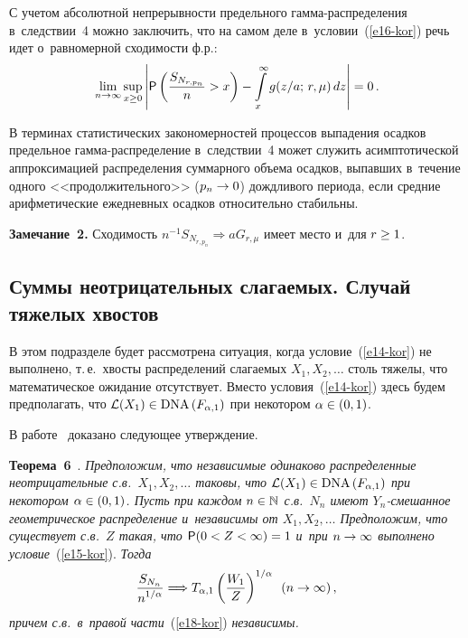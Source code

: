 \begin{multicols}{2}
С учетом абсолютной непрерывности предельного гам\-ма-рас\-пре\-де\-ле\-ния 
в~следствии~4 можно заключить, что на самом деле в~условии~(\ref{e16-kor}) речь
идет о~равномерной сходимости ф.р.:
$$
\lim\limits_{n\to\infty}\sup\limits_{x\ge0}\left\vert {\sf
P}\left(\displaystyle\frac{\displaystyle S_{N_{r,p_n}}\mathstrut}{\displaystyle n\mathstrut}>x\right)-\int\limits_{x}^{\infty}g(z/a;\,r,\mu)\,dz
\right\vert=0\,.
$$

\smallskip

В терминах статистических закономерностей процессов выпадения
осадков предельное гам\-ма-рас\-пре\-де\-ле\-ние в~следствии~4 может служить
асимптотической аппроксимацией распределения суммар\-но\-го объема
осадков, выпавших в~течение одного <<продолжительного>> ($p_n\hm\to0$)
дождливого периода, если средние арифметические ежедневных осадков
относительно стабильны.

\smallskip

\noindent
\textbf{Замечание~2.} Сходимость $ n^{-1}S_{N_{r,p_n}}\Longrightarrow
aG_{r,\mu}$ имеет место и~для $r\hm\ge 1$.


\subsection{Суммы неотрицательных слагаемых. Случай тяжелых хвостов}

В этом подразделе будет рассмотрена ситуация, когда условие~(\ref{e14-kor}) не
выполнено, т.\,е.\ хвосты распределений слагаемых $X_1,X_2,\ldots$
столь тяжелы, что математическое ожидание отсутствует. Вместо
условия~(\ref{e14-kor}) здесь будем предполагать, что $\mathcal{L}(X_1)\hm\in
\mathrm{DNA}\,(F_{\alpha,1})$ при некотором $\alpha\hm\in(0,1)$.

В работе~\cite{Korolev2016TVP} доказано следующее утверждение.

\smallskip

\noindent
\textbf{Теорема~6}~\cite{Korolev2016TVP}. \textit{Предположим, что
независимые одинаково распределенные неотрицательные с.в.\
$X_1,X_2,\ldots$ таковы, что $\mathcal{L}(X_1)\hm\in \mathrm{DNA}\,(F_{\alpha,1})$
при некотором $\alpha\hm\in(0,1)$. Пусть при каждом $n\hm\in\mathbb{N}$
с.в.~$N_n$ имеют $Y_n$-сме\-шан\-ное геометрическое распределение 
и~независимы от $X_1,X_2,\ldots$ Предположим, что существует с.в.~$Z$
такая, что ${\sf P}(0\hm<Z\hm<\infty)\hm=1$ и~при $n\hm\to\infty$ выполнено
условие}~(\ref{e15-kor}). \textit{Тогда}
\begin{equation}
\displaystyle\frac{\displaystyle S_{N_n}\mathstrut}{\displaystyle n^{1/\alpha}\mathstrut}\Longrightarrow T_{\alpha,1}
\left(\displaystyle\frac{\displaystyle W_1\mathstrut}{\displaystyle Z\mathstrut}\right)^{1/\alpha}\enskip (n\to\infty)\,,
\label{e18-kor}
\end{equation}
\textit{причем с.в.\ в~правой части}~(\ref{e18-kor}) \textit{независимы.}


\end{multicols}
